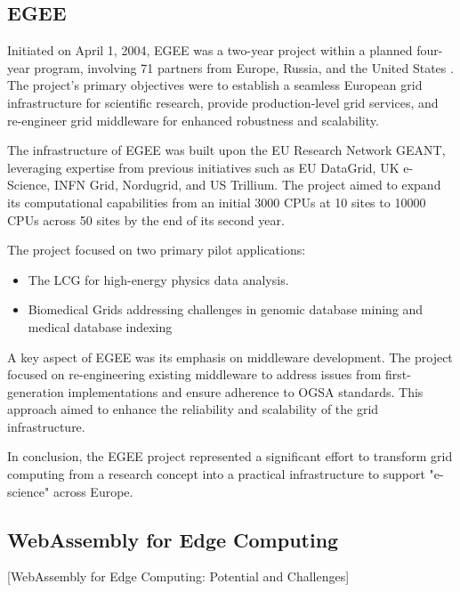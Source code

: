 \subsection{EGEE}
\label{subsec:background:related_work:egee}
Initiated on April 1, 2004, \ac{EGEE} was a two-year project within a planned four-year program, involving 71 partners from Europe, Russia, and the United States \cite{relatedwork:egee}. The project's primary objectives were to establish a seamless European grid infrastructure for scientific research, provide production-level grid services, and re-engineer grid middleware for enhanced robustness and scalability. \cite{relatedwork:egee}

The infrastructure of \ac{EGEE} was built upon the EU Research Network GEANT, leveraging expertise from previous initiatives such as EU DataGrid, UK e-Science, INFN Grid, Nordugrid, and US Trillium. The project aimed to expand its computational capabilities from an initial 3000 CPUs at 10 sites to 10000 CPUs across 50 sites by the end of its second year. \cite{relatedwork:egee}

The project focused on two primary pilot applications: 
\begin{itemize}
  \item The \ac{LCG} for high-energy physics data analysis.
  \item Biomedical Grids addressing challenges in genomic database mining and medical database indexing
\end{itemize}
A key aspect of EGEE was its emphasis on middleware development. The project focused on re-engineering existing middleware to address issues from first-generation implementations and ensure adherence to \ac{OGSA} standards. This approach aimed to enhance the reliability and scalability of the grid infrastructure. \cite{relatedwork:egee}

In conclusion, the \ac{EGEE} project represented a significant effort to transform grid computing from a research concept into a practical infrastructure to support "e-science" across Europe.

\subsection{WebAssembly for Edge Computing}
\label{subsec:background:related_work:wasmedgecomputing}
[WebAssembly for Edge Computing: Potential and Challenges] \cite{relatedwork:wasmedgecomputing}